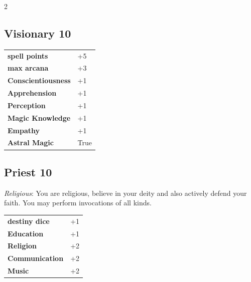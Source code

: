 \begin{multicols}{2}
\begin{tcolorbox}

\end{tcolorbox}

\begin{tcolorbox}
    \subsection*{Visionary \hfill \small{10 }}
    \tcblower




\begin{tabular}{@{}ll@{}}
    \textbf{spell points} & +5\\
    \textbf{max arcana} & +3\\
    \textbf{Conscientiousness} & +1\\
    \textbf{Apprehension} & +1\\
    \textbf{Perception} & +1\\
    \textbf{Magic Knowledge} & +1\\
    \textbf{Empathy} & +1\\
    \textbf{Astral Magic} & True\\
\end{tabular}


\end{tcolorbox}

\begin{tcolorbox}
    \subsection*{Priest \hfill \small{10 }}
    \tcblower
\textit{Religious}: You are religious, believe in your deity and also actively defend your faith. You may perform invocations of all kinds.


\vspace{3mm}

\begin{tabular}{@{}ll@{}}
    \textbf{destiny dice} & +1\\
    \textbf{Education} & +1\\
    \textbf{Religion} & +2\\
    \textbf{Communication} & +2\\
    \textbf{Music} & +2\\
\end{tabular}


\end{tcolorbox}
\end{multicols}
